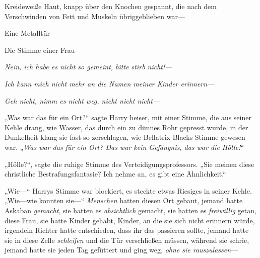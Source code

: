 Kreideweiße Haut, knapp über den Knochen gespannt, die nach dem Verschwinden von Fett und Muskeln übriggeblieben war—

Eine Metalltür—

Die Stimme einer Frau—

\emph{Nein, ich habe es nicht so gemeint, bitte stirb nicht!—}

\emph{Ich kann mich nicht mehr an die Namen meiner Kinder erinnern—}

\emph{Geh nicht, nimm es nicht weg, nicht nicht nicht—}

„Was war das für ein Ort?“ sagte Harry heiser, mit einer Stimme, die aus seiner Kehle drang, wie Wasser, das durch ein zu dünnes Rohr gepresst wurde, in der Dunkelheit klang sie fast so zerschlagen, wie Bellatrix Blacks Stimme gewesen war. „\emph{Was war das für ein Ort? Das war kein Gefängnis, das war die Hölle!}“

„Hölle?“, sagte die ruhige Stimme des Verteidigungsprofessors. „Sie meinen diese christliche Bestrafungsfantasie? Ich nehme an, es gibt eine Ähnlichkeit.“

„Wie—“ Harrys Stimme war blockiert, es steckte etwas Riesiges in seiner Kehle. „Wie—wie konnten sie—“ \emph{Menschen} hatten diesen Ort gebaut, jemand hatte Askaban \emph{gemacht}, sie hatten es \emph{absichtlich} gemacht, sie hatten es \emph{freiwillig} getan, diese Frau, sie hatte Kinder gehabt, Kinder, an die sie sich nicht erinnern würde, irgendein Richter hatte entschieden, dass ihr das passieren sollte, jemand hatte sie in diese Zelle \emph{schleifen} und die Tür verschließen müssen, während sie schrie, jemand hatte sie jeden Tag gefüttert und ging weg, \emph{ohne sie rauszulassen}—

